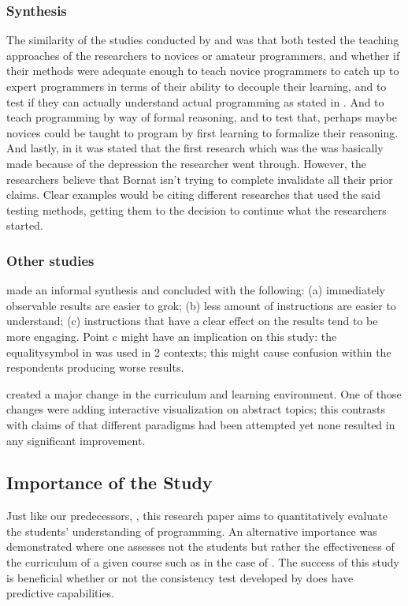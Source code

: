 \documentclass[12pt]{article}
\begin{document}
\subsubsection{Synthesis}
\label{sec:org0b2df0d}
The similarity of the studies conducted by \cite{dehnadi2006camel} and
\cite{bornat2008mental} was that both tested the teaching approaches of
the researchers to novices or amateur programmers, and whether if
their methods were adequate enough to teach novice programmers to
catch up to expert programmers in terms of their ability to \gls{decouple}
their learning, and to test if they can actually understand actual
programming as stated in \cite{dehnadi2006camel}. And to teach
programming by way of formal reasoning, and to test that, perhaps
maybe novices could be taught to program by first learning to
formalize their reasoning. And lastly, in \cite{bornat2014camels} it was
stated that the first research which was the \cite{dehnadi2006camel} was
basically made because of the depression the researcher went
through. However, the researchers believe that Bornat isn’t trying to
complete invalidate all their prior claims. Clear examples would be
citing different researches that used the said testing methods,
getting them to the decision to continue what the researchers started.

\subsubsection{Other studies}
\label{sec:org6bf2fc4}
\cite{bricklin2002} made an informal synthesis and concluded with the following: 
(a) immediately observable results are easier to grok; 
(b) less amount of instructions are easier to understand; 
(c) instructions that have a clear effect on the results tend to be more engaging.
Point c might have an implication on this study: 
the \gls{equalitysymbol} in \cite{dehnadi2006camel} was used in 2 contexts;
this might cause confusion within the respondents producing worse results.

\cite{chalk2003improving} created a major change in the curriculum and learning environment.
One of those changes were adding interactive visualization on abstract topics;
this contrasts with claims of \cite{dehnadi2006camel} that different paradigms had been attempted yet 
none resulted in any significant improvement.

\subsection{Importance of the Study}
\label{sec:org04d9945}
Just like our predecessors, \cite{dehnadi2006camel}, 
this research paper aims to quantitatively evaluate the students' understanding of programming. 
An alternative importance was demonstrated where 
one assesses not the students but rather the effectiveness of the curriculum of a given course
such as in the case of \cite{ford2010assessing}.
The success of this study is beneficial whether or not 
the consistency test developed by \citeauthor{dehnadi2006camel} does have predictive capabilities.
\end{document}
